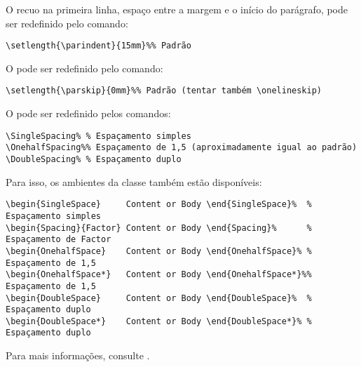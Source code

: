 O recuo na primeira linha, espaço entre a margem e o início do parágrafo, pode ser redefinido pelo comando:

\begin{snugshade}
\begin{Verbatim}
\setlength{\parindent}{15mm}%% Padrão
\end{Verbatim}
\end{snugshade}

O   pode ser redefinido pelo comando:

\begin{snugshade}
\begin{Verbatim}
\setlength{\parskip}{0mm}%% Padrão (tentar também \onelineskip)
\end{Verbatim}
\end{snugshade}

O   pode ser redefinido pelos comandos:

\begin{snugshade}
\begin{Verbatim}
\SingleSpacing% % Espaçamento simples
\OnehalfSpacing%% Espaçamento de 1,5 (aproximadamente igual ao padrão)
\DoubleSpacing% % Espaçamento duplo
\end{Verbatim}
\end{snugshade}

Para isso, os ambientes da classe \texttt{} também estão disponíveis:

\begin{snugshade}
\begin{Verbatim}
\begin{SingleSpace}     Content or Body \end{SingleSpace}%  % Espaçamento simples
\begin{Spacing}{Factor} Content or Body \end{Spacing}%      % Espaçamento de Factor
\begin{OnehalfSpace}    Content or Body \end{OnehalfSpace}% % Espaçamento de 1,5
\begin{OnehalfSpace*}   Content or Body \end{OnehalfSpace*}%% Espaçamento de 1,5
\begin{DoubleSpace}     Content or Body \end{DoubleSpace}%  % Espaçamento duplo
\begin{DoubleSpace*}    Content or Body \end{DoubleSpace*}% % Espaçamento duplo
\end{Verbatim}
\end{snugshade}

Para mais informações, consulte \textcite[\ppno~49--54 e 135]{Wilson2020}.
